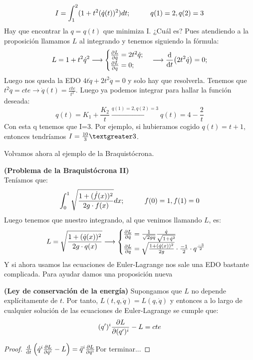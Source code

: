 \documentclass[palatino, bibnumbers]{apuntes}
\begin{document}
\begin{example}$$I=\int_{1}^{2}(1+t^2(\dot{q}(t))^2)dt;\hspace*{1cm} q(1)=2, q(2)=3$$
	Hay que encontrar la $q=q(t)$ que minimiza I. ¿Cuál es? Pues atendiendo a la proposición llamamos $L$ al integrando y tenemos siguiendo la fórmula: $$L=1+t^2\dot{q}^2\longrightarrow\begin{cases}
	\pdv{L}{\dot{q}}=2t^2\dot{q};\\
	\pdv{L}{q}=0;
	\end{cases}\longrightarrow\dv{t}(2t^2\dot{q})=0;$$
	Luego nos queda la EDO $4t\dot{q}+2t^2\ddot{q}=0$ y solo hay que resolverla. Tenemos que $t^2\dot{q}=cte\rightarrow \dot{q}(t)=\frac{cte}{t^2}$. Luego ya podemos integrar para hallar la función deseada: $$q(t)=K_1+\frac{K_2}{t}\xrightarrow{q(1)=2, q(2)=3}q(t)=4-\frac{2}{t}$$
Con esta q tenemos que I=3. Por ejemplo, si hubieramos cogido $q(t)=t+1$, entonces tendríamos $I=\frac{10}{3}\textgreater3$.\\
\end{example}
Volvamos ahora al ejemplo de la Braquistócrona.
\begin{example}\textbf{(Problema de la Braquistócrona II)}\\
Teníamos que:
$$\int_{0}^{1}\sqrt{\frac{1+(\dot{f}(x))^2}{2g\cdot f(x)}}dx;\hspace*{1cm} f(0)=1,f(1)=0$$ 
\newpage
Luego tenemos que nuestro integrando, al que venimos llamando $L$, es:
$$L=\sqrt{\frac{1+(\dot{q}(x))^2}{2g\cdot q(x)}}\longrightarrow\begin{cases}\pdv{L}{\dot{q}}=\frac{1}{\sqrt{2gq}}\frac{\dot{q}}{\sqrt{1+\dot{q}^2}}\\
\pdv{L}{q}=\sqrt{\frac{1+(\dot{q}(x))^2}{2g}}\cdot\frac{-1}{2}\cdot q^{\frac{-3}{2}}
\end{cases}$$
Y si ahora usamos las ecuaciones de Euler-Lagrange nos sale una EDO bastante complicada. Para ayudar damos una proposición nueva
\end{example}
\begin{prop}\textbf{(Ley de conservación de la energía)} Supongamos que $L$ no depende explícitamente de $t$. Por tanto, $L(t,q,\dot{q})=L(q,\dot{q})$ y entonces a lo largo de cualquier solución de las ecuaciones de Euler-Lagrange se cumple que:
\begin{equation}
(q')^i\pdv{L}{(q')^i}-L=cte
\end{equation}
\end{prop}
\begin{proof}
	$\dv{t}\left(\dot{q}^i\pdv{L}{\dot{q}^i}-L\right)=\ddot{q}^i\pdv{L}{\dot{q}^i}$Por terminar...
\end{proof}
\end{document}
